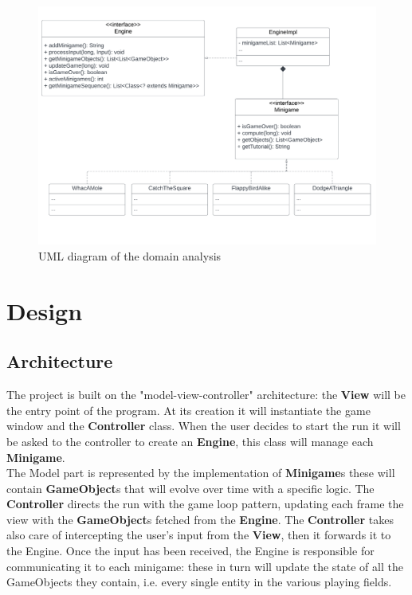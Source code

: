 \documentclass[a4paper,12pt]{report}
\begin{document}
\begin{figure}[ht]
	\centering{}
	\includegraphics[width=\textwidth]{res/Domain.pdf}
	\caption{UML diagram of the domain analysis}
\end{figure}

\chapter{Design}

\section{Architecture}
The project is built on the "model-view-controller" architecture: the \textbf{View} will be the entry point of the program.
At its creation it will instantiate the game window and the \textbf{Controller} class.
When the user decides to start the run it will be asked to the controller to create an \textbf{Engine}, this class will manage each \textbf{Minigame}.\\
The Model part is represented by the implementation of \textbf{Minigame}s these will contain \textbf{GameObject}s that will evolve over time with a specific logic.
The \textbf{Controller} directs the run with the game loop pattern, updating each frame the view with the \textbf{GameObject}s fetched from the \textbf{Engine}.
The \textbf{Controller} takes also care of intercepting the user's input from the \textbf{View}, then it forwards it to the Engine.
Once the input has been received, the Engine is responsible for communicating it to each minigame: these in turn will update the state of all the GameObjects they contain, i.e. every single entity in the various playing fields.
\end{document}
